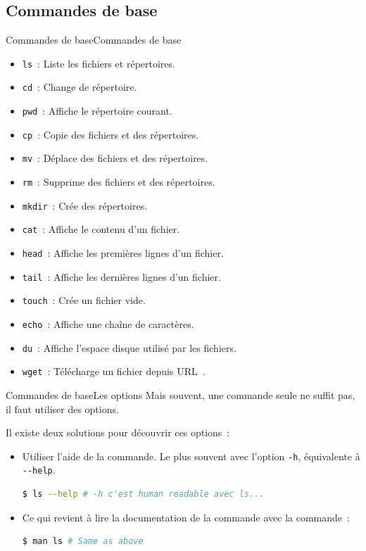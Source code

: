 \documentclass{beamer}
\begin{document}
    \subsection{Commandes de base}\label{subsec:commandes-de-base}

    \begin{frame}{Commandes de base}{Commandes de base}
        \begin{itemize}
            \item \lstinline{ls}~: Liste les fichiers et répertoires.
            \item \lstinline{cd}~: Change de répertoire.
            \item \lstinline{pwd}~: Affiche le répertoire courant.
            \item \lstinline{cp}~: Copie des fichiers et des répertoires.
            \item \lstinline{mv}~: Déplace des fichiers et des répertoires.
            \item \lstinline{rm}~: Supprime des fichiers et des répertoires.
            \item \lstinline{mkdir}~: Crée des répertoires.
            \item \lstinline{cat}~: Affiche le contenu d'un fichier.
            \item \lstinline{head}~: Affiche les premières lignes d'un fichier.
            \item \lstinline{tail}~: Affiche les dernières lignes d'un fichier.
            \item \lstinline{touch}~: Crée un fichier vide.
            \item \lstinline{echo}~: Affiche une chaîne de caractères.
            \item \lstinline{du}~: Affiche l'espace disque utilisé par les fichiers.
            \item \lstinline{wget}~: Télécharge un fichier depuis URL~.
        \end{itemize}
    \end{frame}

    \begin{frame}[fragile]{Commandes de base}{Les options}
        Mais souvent, une commande seule ne suffit pas, il faut utiliser des options.

        Il existe deux solutions pour découvrir ces options~:
        \begin{itemize}
            \item Utiliser l'aide de la commande.
            Le plus souvent avec l'option \lstinline{-h}, équivalente à \lstinline{--help}.
            \begin{lstlisting}[language=bash]
$ ls --help # -h c'est human readable avec ls...
            \end{lstlisting}
            \item Ce qui revient à lire la documentation de la commande avec la commande~:
            \begin{lstlisting}[language=bash]
$ man ls # Same as above
            \end{lstlisting}
        \end{itemize}
    \end{frame}
\end{document}
